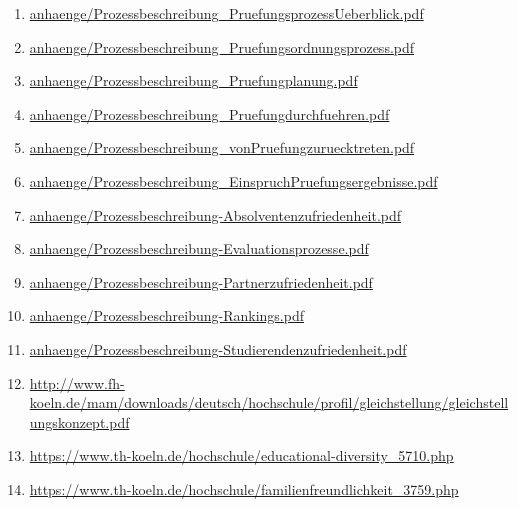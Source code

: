 \documentclass[BCOR12mm,DIV11,titlepage,a4paper,oneside,10pt]{scrbook}
\begin{document}
\begin{sloppypar}
\begin{flushleft}
\begin{enumerate}
\item{\url{anhaenge/Prozessbeschreibung\_PruefungsprozessUeberblick.pdf}} 
\item{\url{anhaenge/Prozessbeschreibung\_Pruefungsordnungsprozess.pdf}} 
\item{\url{anhaenge/Prozessbeschreibung\_Pruefungplanung.pdf}} 
\item{\url{anhaenge/Prozessbeschreibung\_Pruefungdurchfuehren.pdf}} 
\item{\url{anhaenge/Prozessbeschreibung\_vonPruefungzuruecktreten.pdf}} 
\item{\url{anhaenge/Prozessbeschreibung\_EinspruchPruefungsergebnisse.pdf}} 
\item{\url{anhaenge/Prozessbeschreibung-Absolventenzufriedenheit.pdf}} 
\item{\url{anhaenge/Prozessbeschreibung-Evaluationsprozesse.pdf}} 
\item{\url{anhaenge/Prozessbeschreibung-Partnerzufriedenheit.pdf}} 
\item{\url{anhaenge/Prozessbeschreibung-Rankings.pdf}} 
\item{\url{anhaenge/Prozessbeschreibung-Studierendenzufriedenheit.pdf}} 
\item{\url{http://www.fh-koeln.de/mam/downloads/deutsch/hochschule/profil/gleichstellung/gleichstellungskonzept.pdf}} 
\item{\url{https://www.th-koeln.de/hochschule/educational-diversity\_5710.php}} 
\item{\url{https://www.th-koeln.de/hochschule/familienfreundlichkeit\_3759.php}} 

\end{enumerate}

\end{flushleft}
\end{sloppypar}

\backmatter
\end{document}
